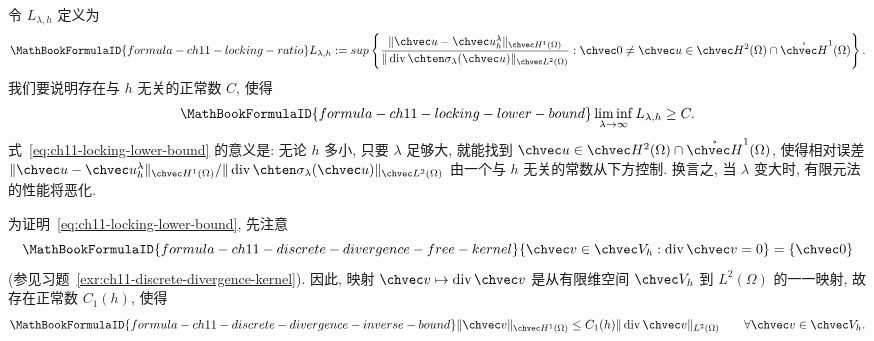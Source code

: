 令 $L_{\lambda,h}$ 定义为
\[
\MathBookFormulaID{formula-ch11-locking-ratio}
L_{\lambda,h}:=sup\left\{
\frac{\|\chvec u-\chvec u_h^\lambda\|_{\chvec H^1(\Omega)}}
{\|\operatorname{div}\chten\sigma_\lambda(\chvec u)\|_{\chvec L^2(\Omega)}}:
\chvec0\neq\chvec u\in\chvec H^2(\Omega)\cap\mathring{\chvec H}^1(\Omega)
\right\}.
\]
我们要说明存在与 $h$ 无关的正常数 $C$, 使得
\begin{equation}
\MathBookFormulaID{formula-ch11-locking-lower-bound}
\label{eq:ch11-locking-lower-bound}
\liminf_{\lambda\to\infty}L_{\lambda,h}\geq C.
\end{equation}
式~\eqref{eq:ch11-locking-lower-bound} 的意义是: 无论 $h$ 多小, 只要 $\lambda$ 足够大, 就能找到 $\chvec u\in\chvec H^2(\Omega)\cap\mathring{\chvec H}^1(\Omega)$, 使得相对误差
$\|\chvec u-\chvec u_h^\lambda\|_{\chvec H^1(\Omega)}/
\|\operatorname{div}\chten\sigma_\lambda(\chvec u)\|_{\chvec L^2(\Omega)}$ 由一个与 $h$ 无关的常数从下方控制. 换言之, 当 $\lambda$ 变大时, 有限元法的性能将恶化.

为证明~\eqref{eq:ch11-locking-lower-bound}, 先注意
\begin{equation}
\MathBookFormulaID{formula-ch11-discrete-divergence-free-kernel}
\label{eq:ch11-discrete-divergence-free-kernel}
\{\chvec v\in\chvec V_h:\operatorname{div}\chvec v=0\}=\{\chvec0\}
\end{equation}
(参见习题~\ref{exr:ch11-discrete-divergence-kernel}). 因此, 映射 $\chvec v\mapsto\operatorname{div}\chvec v$ 是从有限维空间 $\chvec V_h$ 到 $L^2(\Omega)$ 的一一映射, 故存在正常数 $C_1(h)$, 使得
\begin{equation}
\MathBookFormulaID{formula-ch11-discrete-divergence-inverse-bound}
\label{eq:ch11-discrete-divergence-inverse-bound}
\|\chvec v\|_{\chvec H^1(\Omega)}
\leq C_1(h)\|\operatorname{div}\chvec v\|_{L^2(\Omega)}
\qquad\forall\chvec v\in\chvec V_h.
\end{equation}

